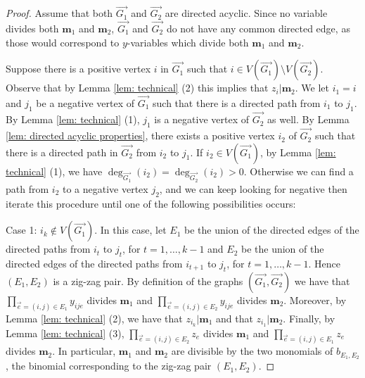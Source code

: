 \documentclass[11pt]{article}
\theoremstyle{definition}
\numberwithin{equation}{section}
\begin{document}
\begin{proof}
     Assume that both $\overrightarrow{G_1}$ and $\overrightarrow{G_2}$ are directed acyclic. Since no variable divides both $\mathbf{m}_1$ and $\mathbf{m}_2$, $\overrightarrow{G_1}$ and $\overrightarrow{G_2}$ do not have any common directed edge, as those would correspond to $y$-variables which divide both $\mathbf{m}_1$ and $\mathbf{m}_2$.
     
     Suppose there is a positive vertex $i$ in $\overrightarrow{G_1}$ such that $i\in V(\overrightarrow{G_1})\setminus V(\overrightarrow{G_2})$. Observe that by Lemma \ref{lem: technical} (2) this implies that $z_i|\mathbf{m}_2$. 
     We let $i_1=i$ and $j_1$ be a negative vertex of $\overrightarrow{G_1}$ such that there is a directed path from $i_1$ to $j_1$. 
     By Lemma \ref{lem: technical} (1), $j_1$ is a negative vertex of $\overrightarrow{G_2}$ as well. 
     By Lemma \ref{lem: directed acyclic properties}, there exists a positive vertex $i_2$ of $\overrightarrow{G_2}$ such that there is a directed path in $\overrightarrow{G_2}$ from $i_2$ to $j_1$. If $i_2\in V(\overrightarrow{G_1})$, by Lemma \ref{lem: technical} (1), we have $\deg_{\overrightarrow{G_1}}(i_2)=\deg_{\overrightarrow{G_2}}(i_2)>0$. 
     Otherwise we can find a path from $i_2$ to a negative vertex $j_2$, and we can keep looking for negative then iterate this procedure until one of the following possibilities occurs:
     
     {\sf Case 1:} $i_k\notin V(\overrightarrow{G_1})$. In this case, let $E_1$ be the union of the directed edges of the directed paths from $i_t$ to $j_t$, for $t=1,\dots,k-1$ and $E_2$ be the union of the directed edges of the directed paths from $i_{t+1}$ to $j_t$, for $t=1,\dots,k-1$. Hence $(E_1,E_2)$ is a zig-zag pair. By definition of the graphs $(\overrightarrow{G_1},\overrightarrow{G_2})$ we have that $\prod_{\overset{\to}{e}=(i,j)\in E_1}y_{ije}$ divides $\mathbf{m}_1$ and $\prod_{\overset{\to}{e}=(i,j)\in E_2}y_{ije}$ divides $\mathbf{m}_2$. Moreover, by Lemma \ref{lem: technical} (2), we have that $z_{i_k}|\mathbf{m}_1$ and that $z_{i_1}|\mathbf{m}_2$. Finally, by Lemma \ref{lem: technical} (3), $\prod_{\overset{\to}{e}=(i,j)\in E_2} z_e$ divides $\mathbf{m}_1$ and $\prod_{\overset{\to}{e}=(i,j)\in E_1} z_e$ divides $\mathbf{m}_2$. 
      In particular, $\mathbf{m}_1$ and $\mathbf{m}_2$ are divisible by the two monomials of $b_{E_1,E_2}$, the binomial corresponding to the zig-zag pair $(E_1,E_2)$.
      

\end{proof}
\end{document}
